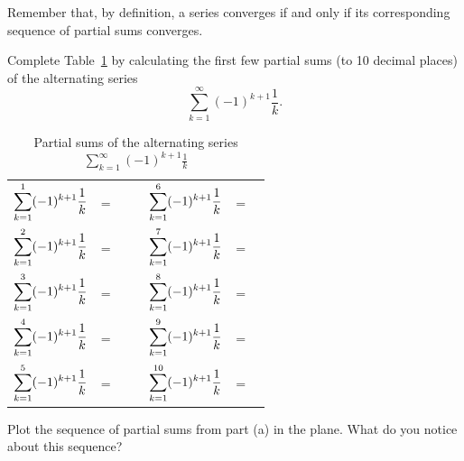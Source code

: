 \begin{activity} \label{8.4.Act1} Remember that, by definition, a series converges if and only if its corresponding sequence of partial sums converges.  
\ba
\item Complete Table~\ref{T:8.4.1_alt_harmonic} by calculating the first few partial sums (to 10 decimal places) of the alternating series
\[ \sum_{k=1}^{\infty} (-1)^{k+1}\frac{1}{k}.\]
\begin{table}[ht]
\begin{center}
\renewcommand{\arraystretch}{1.5}
\begin{tabular}{r c p{1.5in} p{0.25in}  r c p{1.5in}} \\
$\displaystyle \sum_{k=1}^{1} (-1)^{k+1}\frac{1}{k}$  & =  &  & &$\displaystyle \sum_{k=1}^{6} (-1)^{k+1}\frac{1}{k}$ 	& =& \\
$\displaystyle \sum_{k=1}^{2} (-1)^{k+1}\frac{1}{k}$  & = &  & &$\displaystyle \sum_{k=1}^{7} (-1)^{k+1}\frac{1}{k}$ 	& =& \\
$\displaystyle \sum_{k=1}^{3} (-1)^{k+1}\frac{1}{k}$  & = &  & &$\displaystyle \sum_{k=1}^{8} (-1)^{k+1}\frac{1}{k}$& =	& \\
$\displaystyle \sum_{k=1}^{4} (-1)^{k+1}\frac{1}{k}$  & = &  & &$\displaystyle \sum_{k=1}^{9} (-1)^{k+1}\frac{1}{k}$	& =& \\
$\displaystyle \sum_{k=1}^{5} (-1)^{k+1}\frac{1}{k}$  & = &  & &$\displaystyle \sum_{k=1}^{10} (-1)^{k+1}\frac{1}{k}$	& =& \\
\end{tabular}
\caption{Partial sums of the alternating series $\sum_{k=1}^{\infty} (-1)^{k+1} \frac{1}{k}$}
\label{T:8.4.1_alt_harmonic}
\end{center}
\end{table}



\item Plot the sequence of partial sums from part (a) in the plane. What do you notice about this sequence?



\ea
\end{activity}

